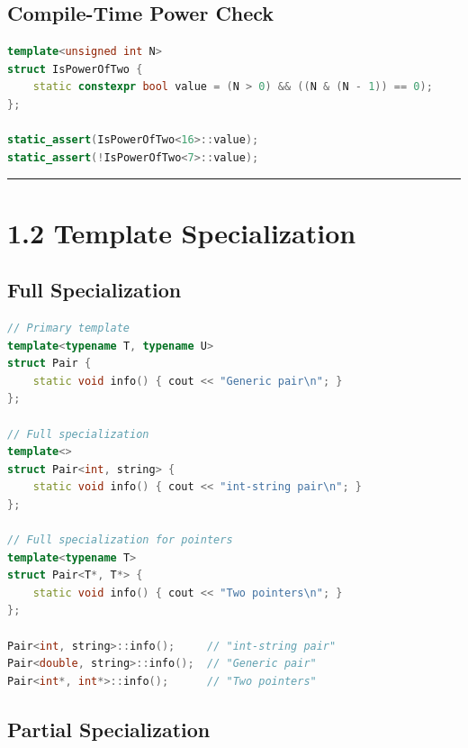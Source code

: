 \hypertarget{compile-time-power-check}{%
\subsection{Compile-Time Power Check}\label{compile-time-power-check}}

\begin{lstlisting}[language={C++}]
template<unsigned int N>
struct IsPowerOfTwo {
    static constexpr bool value = (N > 0) && ((N & (N - 1)) == 0);
};

static_assert(IsPowerOfTwo<16>::value);
static_assert(!IsPowerOfTwo<7>::value);
\end{lstlisting}

\begin{center}\rule{0.5\linewidth}{0.5pt}\end{center}

\hypertarget{template-specialization}{%
\section{1.2 Template Specialization}\label{template-specialization}}

\hypertarget{full-specialization}{%
\subsection{Full Specialization}\label{full-specialization}}

\begin{lstlisting}[language={C++}]
// Primary template
template<typename T, typename U>
struct Pair {
    static void info() { cout << "Generic pair\n"; }
};

// Full specialization
template<>
struct Pair<int, string> {
    static void info() { cout << "int-string pair\n"; }
};

// Full specialization for pointers
template<typename T>
struct Pair<T*, T*> {
    static void info() { cout << "Two pointers\n"; }
};

Pair<int, string>::info();     // "int-string pair"
Pair<double, string>::info();  // "Generic pair"
Pair<int*, int*>::info();      // "Two pointers"
\end{lstlisting}

\hypertarget{partial-specialization}{%
\subsection{Partial Specialization}\label{partial-specialization}}

